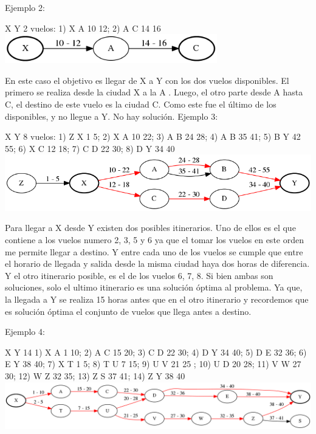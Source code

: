 \documentclass[a4paper]{article}
\begin{document}
Ejemplo 2:

X Y 2
vuelos:
1) X A 10 12;  2) A C  14 16\newline
\includegraphics[width=\textwidth,height=0.5in,keepaspectratio
]{ejemplo2.png}\newline

En este caso el objetivo es llegar de X a Y con los dos vuelos disponibles. El primero  se realiza desde la ciudad X a la A . Luego, el otro parte desde A hasta C, el destino de este vuelo es la ciudad C. Como este fue el último de los disponibles, y  no llegue a Y. No hay solución.\newline \newline
\newpage
Ejemplo 3:

X Y 8
vuelos:
1) Z X 1 5;  2) X A 10 22;  3) A B  24 28;  4) A B 35 41;   5) B Y 42 55;  6) X C 12 18;
7) C D 22 30;  8) D Y 34 40\newline
\includegraphics[width=\textwidth,height=\textheight,keepaspectratio
]{ejemplo3.png}\newline


Para llegar a X desde Y existen dos posibles itinerarios. Uno de ellos es el que contiene a los vuelos numero 2, 3, 5 y 6 ya que el tomar los vuelos en este orden me permite llegar a destino. Y entre cada uno de los vuelos se cumple que entre el horario de llegada y salida desde la misma ciudad  
haya dos horas de diferencia. Y el otro itinerario posible, es el de los vuelos 6, 7, 8. Si bien ambas son soluciones, solo el ultimo itinerario es una solución óptima al problema. Ya que, la llegada a Y se realiza 15 horas antes que en el otro itinerario y recordemos que es solución óptima el conjunto de vuelos que llega antes a destino.\newline  \newline


Ejemplo 4:

X Y 14
1) X A 1 10;  2) A C 15 20;  3) C D 22 30;  4) D Y 34 40;  5) D E 32 36;  6) E Y 38 40;  7) X T 1 5;
8) T U 7 15;  9) U V 21 25 ;  10) U D 20 28;  11) V W 27 30;  12) W Z 32 35;  13)  Z S 37 41;
14) Z Y 38 40  
\includegraphics[width=\textwidth,height=\textheight,keepaspectratio
]{ejemplo4.png}\newline
\end{document}

